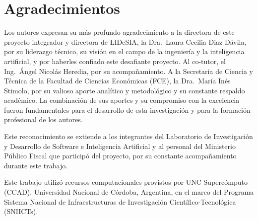 \chapter*{Agradecimientos}

Los autores expresan su más profundo agradecimiento a la directora de este proyecto integrador y directora de LIDeSIA, la Dra.~Laura Cecilia Diaz Dávila, por su liderazgo técnico, su visión en el campo de la ingeniería y la inteligencia artificial, y por haberles confiado este desafiante proyecto. Al co-tutor, el Ing.~Ángel Nicolás Heredia, por su acompañamiento. A la Secretaria de Ciencia y Técnica de la Facultad de Ciencias Económicas (FCE), la Dra.~María Inés Stimolo, por su valioso aporte analítico y metodológico y su constante respaldo académico. La combinación de sus aportes y su compromiso con la excelencia fueron fundamentales para el desarrollo de esta investigación y para la formación profesional de los autores.

Este reconocimiento se extiende a los integrantes del Laboratorio de Investigación y Desarrollo de Software e Inteligencia Artificial y al personal del Ministerio Público Fiscal que participó del proyecto, por su constante acompañamiento durante este trabajo.

Este trabajo utilizó recursos computacionales provistos por UNC Supercómputo (CCAD), Universidad Nacional de Córdoba, Argentina, en el marco del Programa Sistema Nacional de Infraestructuras de Investigación Científico-Tecnológica (SNIICTs).
